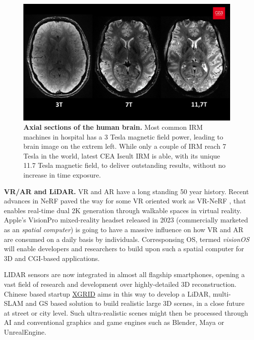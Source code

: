 \begin{figure}[htb!]
  \center
\includegraphics[width=\linewidth]{images/conclusion/cea-iseult.jpg}
\caption{\textbf{Axial sections of the human brain.} Most common IRM machines in hospital has a 3 Tesla magnetic field power, leading to brain image on the extrem left. While only a couple of IRM reach 7 Tesla in the world, latest CEA Iseult IRM is able, with its unique 11.7 Tesla magnetic field, to deliver outstanding results, without no increase in time exposure.}
\label{fig:conclusion-ceaiseult}
\end{figure}


\noindent \textbf{VR/AR and LiDAR.} \ac{VR} and \ac{AR} have a long standing 50 year history. Recent advances in \ac{NeRF} paved the way for some VR oriented work as VR-NeRF \citep{xu2023vr}, that enables real-time dual 2K generation through walkable spaces in virtual reality. Apple's VisionPro mixed-reality headset released in 2023 (commercially marketed as an \textit{spatial computer}) is going to have a massive influence on how \ac{VR} and \ac{AR} are consumed on a daily basis by individuals. Corresponsing OS, termed \textit{visionOS} will enable developers and researchers to build upon such a {spatial computer} for 3D and \ac{CGI}-based applications.

LIDAR sensors are now integrated in almost all flagship smartphones, opening a vast field of research and development over highly-detailed 3D reconstruction. Chinese based startup \href{https://www.xgrids.com/}{XGRID} aims in this way to develop a LiDAR, multi-SLAM and \ac{GS} based solution to build realistic large 3D scenes, in a close future at street or city level. Such ultra-realistic scenes might then be processed through \ac{AI} and conventional graphics and game engines such as Blender, Maya or UnrealEngine. 

